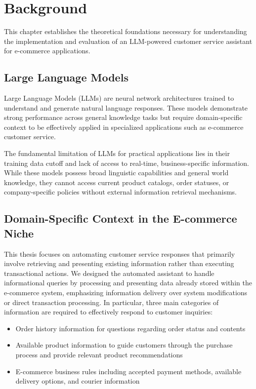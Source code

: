 \chapter{Background}
\label{cha:background}

This chapter establishes the theoretical foundations necessary for understanding the implementation and evaluation of an LLM-powered customer service assistant for e-commerce applications.

\section{Large Language Models}

Large Language Models (LLMs) are neural network architectures trained to understand and generate natural language responses. These models demonstrate strong performance across general knowledge tasks but require domain-specific context to be effectively applied in specialized applications such as e-commerce customer service.

The fundamental limitation of LLMs for practical applications lies in their training data cutoff and lack of access to real-time, business-specific information.
While these models possess broad linguistic capabilities and general world knowledge, they cannot access current product catalogs, order statuses, or company-specific policies without external information retrieval mechanisms.

\section{Domain-Specific Context in the E-commerce Niche}

This thesis focuses on automating customer service responses that primarily involve retrieving and presenting existing information rather than executing transactional actions.
We designed the automated assistant to handle informational queries by processing and presenting data already stored within the e-commerce system, emphasizing information delivery over system modifications or direct transaction processing.
In particular, three main categories of information are required to effectively respond to customer inquiries:
\begin{itemize}
    \item Order history information for questions regarding order status and contents
    \item Available product information to guide customers through the purchase process and provide relevant product recommendations
    \item E-commerce business rules including accepted payment methods, available delivery options, and courier information
\end{itemize}

